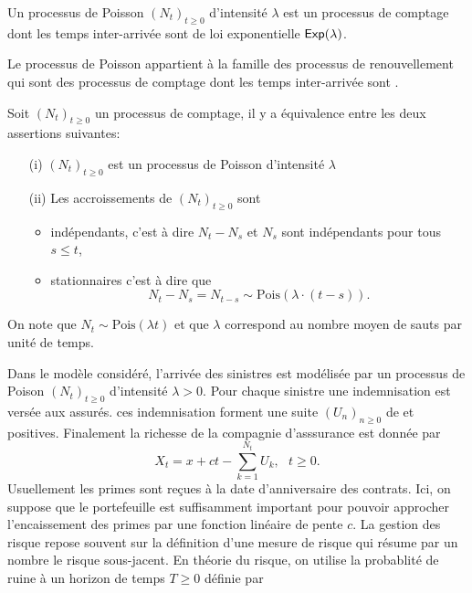 \begin{definition}\label{def_poisson_process}
Un processus de Poisson $(N_t)_{t\geq0}$ d'intensité $\lambda$ est un processus de comptage dont les temps inter-arrivée \iid sont de loi exponentielle $\mathsf{Exp}(\lambda)$.
\end{definition}
\begin{remark}\label{def_renewal_process}
Le processus de Poisson appartient à la famille des processus de renouvellement qui sont des processus de comptage dont les temps inter-arrivée sont \iid.
\end{remark}
\begin{prop}
Soit $(N_t)_{t\geq 0}$ un processus de comptage, il y a équivalence entre les deux assertions suivantes:
\begin{itemize}
    \item[(i)] $(N_t)_{t\geq0}$ est un processus de Poisson d'intensité $\lambda$
    \item[(ii)] Les accroissements de $(N_t)_{t\geq 0}$ sont
    \begin{itemize}
        \item indépendants, c'est à dire $N_{t}-N_{s}$ et $N_s$ sont indépendants pour tous $s\leq t$,
        \item stationnaires c'est à dire que 
        $$
        N_t - N_s = N_{t-s}\sim\text{Pois}(\lambda\cdot(t-s)).
        $$
    \end{itemize}
\end{itemize}
On note que $N_t\sim\text{Pois}(\lambda t)$ et que $\lambda$ correspond au nombre moyen de sauts par unité de temps. 
\end{prop}
Dans le modèle considéré, l'arrivée des sinistres est modélisée par un processus de Poison $(N_t)_{t\geq0}$ d'intensité $\lambda>0$. Pour chaque sinistre une indemnisation est versée aux assurés. ces indemnisation forment une suite $(U_n)_{n\geq0}$ de \va \iid et positives. Finalement la richesse de la compagnie d'asssurance est donnée par 
\begin{equation}\label{eq:cramer_lundberg_modele}
X_t = x + ct - \sum_{k=1}^{N_t}U_k,\text{ }t\geq 0.
\end{equation}
Usuellement les primes sont reçues à la date d'anniversaire des contrats. Ici, on suppose que le portefeuille est suffisamment important pour pouvoir approcher l'encaissement des primes par une fonction linéaire de pente $c$. La gestion des risque repose souvent sur la définition d'une mesure de risque qui résume par un nombre le risque sous-jacent. En théorie du risque, on utilise la probablité de ruine à un horizon de temps $T\geq 0$ définie par 
